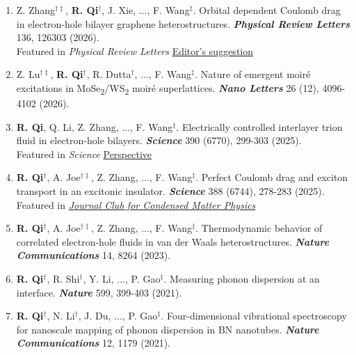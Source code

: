 \documentclass[11pt,sans]{moderncv}
\newcommand{\myemph}[1]{\textbf{\textit{#1}}}
\newcommand{\myname}[1]{\textbf{#1}}
\newcommand{\mylink}[1]{\href{#1}{\color{mycolor}\faLink}}
\begin{document}
\begin{enumerate}[topsep=2pt,itemsep=1ex,partopsep=1ex,parsep=1ex,leftmargin=6.35em]
	\item Z. Zhang$^{\dag\ddag}$, \myname{R. Qi}$^\dag$, J. Xie, ..., F. Wang$^\ddag$. 
	Orbital dependent Coulomb drag in electron-hole bilayer graphene heterostructures. 
	\myemph{Physical Review Letters} 136, 126303 (2026). 
	\mylink{ https://doi.org/10.1103/4v1f-lkh2}
	\\Featured in \emph{Physical Review Letters} \href{https://journals.aps.org/prl/issues/136/12}{\color{mycolor} Editor's suggestion}

	\item Z. Lu$^{\dag\ddag}$, \myname{R. Qi}$^\dag$, R. Dutta$^\dag$, ..., F. Wang$^\ddag$. 
	Nature of emergent moiré excitations in MoSe\textsubscript{2}/WS\textsubscript{2} moiré superlattices. 
	\myemph{Nano Letters} 26 (12), 4096-4102 (2026). 
	\mylink{https://doi.org/10.1021/acs.nanolett.5c06149}

	\item \myname{R. Qi}, Q. Li, Z. Zhang, ..., F. Wang$^\ddag$. 
	Electrically controlled interlayer trion fluid in electron-hole bilayers. 
	\myemph{Science} 390 (6770), 299-303 (2025).
	\mylink{https://www.science.org/doi/10.1126/science.adn4584}
	\\Featured in \emph{Science} \href{https://www.science.org/doi/10.1126/science.aec0463}{\color{mycolor} Perspective}

	\item \myname{R. Qi}$^\dag$, A. Joe$^{\dag\ddag}$, Z. Zhang, ..., F. Wang$^\ddag$. 
	Perfect Coulomb drag and exciton transport in an excitonic insulator. 
	\myemph{Science} 388 (6744), 278-283 (2025).
	\mylink{https://www.science.org/doi/10.1126/science.adl1839}
	\\Featured in \href{https://www.condmatjclub.org/jccm_january_2026_01}{\color{mycolor} \emph{Journal Club for Condensed Matter Physics}}


	\item \myname{R. Qi}$^\dag$, A. Joe$^{\dag\ddag}$, Z. Zhang, ..., F. Wang$^\ddag$. 
	Thermodynamic behavior of correlated electron-hole fluids in van der Waals heterostructures. 
	\myemph{Nature Communications} {14}, 8264 (2023). 
	\mylink{https://www.nature.com/articles/s41467-023-43799-7} 
	
	\item \myname{R. Qi}$^\dag$, R. Shi$^\dag$, Y. Li, ..., P. Gao$^\ddag$. 
	Measuring phonon dispersion at an interface. 
	\myemph{Nature} 599, 399-403 (2021). 
	\mylink{https://www.nature.com/articles/s41586-021-03971-9}

	\item \myname{R. Qi}$^\dag$, N. Li$^\dag$, J. Du, ..., P. Gao$^\ddag$. 
	Four-dimensional vibrational spectroscopy for nanoscale mapping of phonon dispersion in BN nanotubes. 
	\myemph{Nature Communications} {12}, 1179 (2021). 
	\mylink{https://www.nature.com/articles/s41467-021-21452-5}


\end{enumerate}
\end{document}
